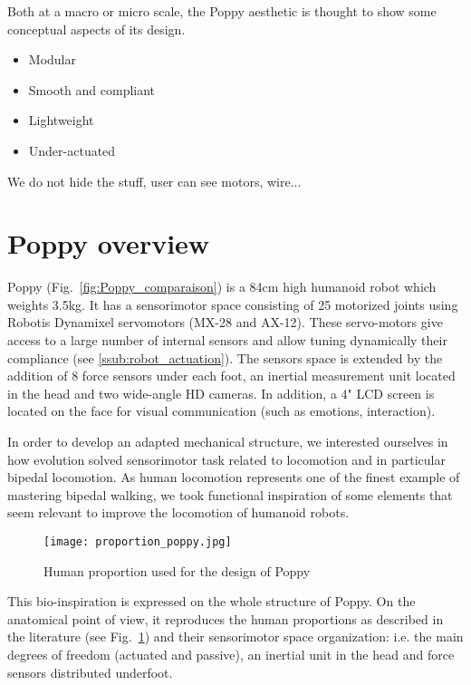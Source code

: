 Both at a macro or micro scale, the Poppy aesthetic is thought to show some conceptual aspects of its design.
\begin{itemize}
    \item Modular
    \item Smooth and compliant
    \item Lightweight
    \item Under-actuated
\end{itemize}

We do not hide the stuff, user can see motors, wire...



\section{Poppy overview} %

Poppy (Fig.~\ref{fig:Poppy_comparaison}) is a 84cm high humanoid robot which weights 3.5kg.
It has a sensorimotor space consisting of 25 motorized joints using Robotis Dynamixel servomotors (MX-28 and AX-12).
These servo-motors give access to a large number of internal sensors and allow tuning dynamically their compliance (see \ref{ssub:robot_actuation}).
The sensors space is extended by the addition of 8 force sensors under each foot, an inertial measurement unit located in the head and two wide-angle HD cameras.
In addition, a 4" LCD screen is located on the face for visual communication (such as emotions, interaction).



In order to develop an adapted mechanical structure, we interested ourselves in how evolution solved sensorimotor task related to locomotion and in particular bipedal locomotion.
As human locomotion represents one of the finest example of mastering bipedal walking, we took functional inspiration of some elements that seem relevant to improve the locomotion of humanoid robots.

\begin{figure}[thpb]
    \centering
    \texttt{[image: proportion\_poppy.jpg]}
    \caption{Human proportion used for the design of Poppy \cite{dufour2005biomecanique}}
    \label{fig:proportion_poppy}
\end{figure}

This bio-inspiration is expressed on the whole structure of Poppy.
On the anatomical point of view, it reproduces the human proportions as described in the literature \cite{dufour2005biomecanique}  (see Fig.~\ref{fig:proportion_poppy}) and their sensorimotor space organization: i.e.
the main degrees of freedom (actuated and passive), an inertial unit in the head and force sensors distributed underfoot.

